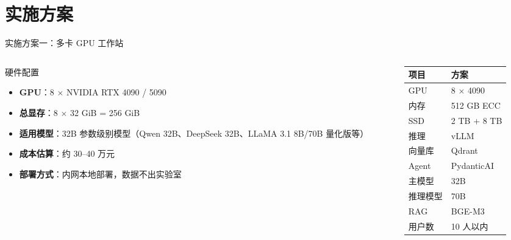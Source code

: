 \documentclass[aspectratio=169, 10pt, UTF8]{ctexbeamer}
\begin{document}
\section{实施方案}

\begin{frame}{实施方案一：多卡 GPU 工作站}
  \begin{columns}[T]
    \begin{column}{0.48\textwidth}
      \begin{exampleblock}{硬件配置}
        \begin{itemize}
          \item \textbf{GPU}：8 $\times$ NVIDIA RTX 4090 / 5090
          \item \textbf{总显存}：8 $\times$ 32 GiB = \alert{256 GiB}
          \item \textbf{适用模型}：32B 参数级别模型（Qwen 32B、DeepSeek 32B、LLaMA 3.1 8B/70B 量化版等）
          \item \textbf{成本估算}：\alert{约 30--40 万元}
          \item \textbf{部署方式}：内网本地部署，数据不出实验室
        \end{itemize}
      \end{exampleblock}
    \end{column}
    \begin{column}{0.48\textwidth}
      \begin{table}
        \centering
        \small
        \begin{tabular}{l l}
          \toprule
          \textbf{项目} & \textbf{方案} \\
          \midrule
          GPU   & 8 $\times$ 4090 \\
          内存  & 512 GB ECC \\
          SSD   & 2 TB + 8 TB \\
          推理  & vLLM \\
          向量库 & Qdrant \\
          Agent & PydanticAI \\
          主模型 & 32B \\
          推理模型 & 70B \\
          RAG   & BGE-M3 \\
          用户数 & 10 人以内 \\
          \bottomrule
        \end{tabular}
      \end{table}
    \end{column}
  \end{columns}
\end{frame}
\end{document}
